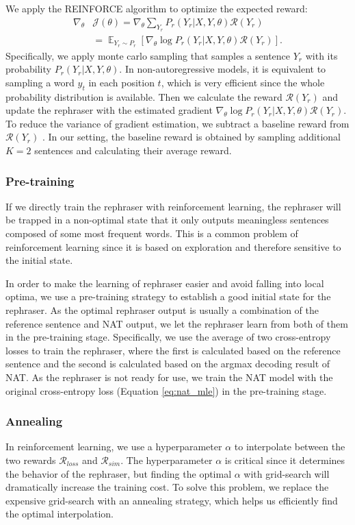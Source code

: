 \documentclass[letterpaper]{article} %
\begin{document}
We apply the REINFORCE algorithm \cite{williams1992simple} to optimize the expected reward:
\begin{equation}
\begin{aligned}
\label{eq:rl}
\nabla_{\theta}&\mathcal{J}(\theta)=\nabla_{\theta}\sum_{Y_r}P_r(Y_r|X,Y,\theta)\mathcal{R}(Y_r)\\
&=\mathop{\mathbb{E}}_{Y_r \sim P_r}[\nabla_{\theta}\log P_r(Y_r|X,Y,\theta)\mathcal{R}(Y_r)].
\end{aligned}
\end{equation}
Specifically, we apply monte carlo sampling that samples a sentence $Y_r$ with its probability $P_r(Y_r|X,Y,\theta)$. In non-autoregressive models, it is equivalent to sampling a word $y_t$ in each position $t$, which is very efficient since the whole probability distribution is available. Then we calculate the reward $\mathcal{R}(Y_r)$ and update the rephraser with the estimated gradient $\nabla_{\theta}\log P_r(Y_r|X,Y,\theta)\mathcal{R}(Y_r)$. To reduce the variance of gradient estimation, we subtract a baseline reward from $\mathcal{R}(Y_r)$ \cite{10.5555/647235.720252}. In our setting, the baseline reward is obtained by sampling additional $K=2$ sentences and calculating their average reward.
\subsubsection{Pre-training}
If we directly train the rephraser with reinforcement learning, the rephraser will be trapped in a non-optimal state that it only outputs meaningless sentences composed of some most frequent words. This is a common problem of reinforcement learning since it is based on exploration and therefore sensitive to the initial state.

In order to make the learning of rephraser easier and avoid falling into local optima, we use a pre-training strategy to establish a good initial state for the rephraser. As the optimal rephraser output is usually a combination of the reference sentence and NAT output, we let the rephraser learn from both of them in the pre-training stage. Specifically, we use the average of two cross-entropy losses to train the rephraser, where the first is calculated based on the reference sentence and the second is calculated based on the argmax decoding result of NAT. As the rephraser is not ready for use, we train the NAT model with the original cross-entropy loss (Equation \ref{eq:nat_mle}) in the pre-training stage. 

\subsubsection{Annealing}
In reinforcement learning, we use a hyperparameter $\alpha$ to interpolate between the two rewards $\mathcal{R}_{loss}$ and $\mathcal{R}_{sim}$. The hyperparameter $\alpha$ is critical since it determines the behavior of the rephraser, but finding the optimal $\alpha$ with grid-search will dramatically increase the training cost. To solve this problem, we replace the expensive grid-search with an annealing strategy, which helps us efficiently find the optimal interpolation.
\end{document}
